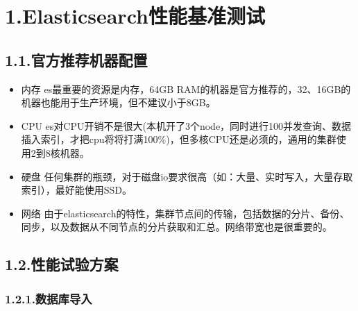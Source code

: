 \documentclass{article}
\begin{document}
\section{1.\hspace*{0.5em}Elasticsearch性能基准测试}\label{sec-elasticsearch}%

\subsection{1.1.\hspace*{0.5em}官方推荐机器配置}\label{section}%

\begin{itemize}[noitemsep,topsep=\mdcompacttopsep]%

\item{}内存    \mdbr
{}es最重要的资源是内存，64GB RAM的机器是官方推荐的，32、16GB的机器也能用于生产环境，但不建议小于8GB。%

\item{}CPU    \mdbr
{}es对CPU开销不是很大(本机开了3个node，同时进行100并发查询、数据插入索引，才把cpu将将打满100\%)，但多核CPU还是必须的，通用的集群使用2到8核机器。%

\item{}硬盘    \mdbr
{}任何集群的瓶颈，对于磁盘io要求很高（如：大量、实时写入，大量存取索引），最好能使用SSD。%

\item{}网络    \mdbr
{}由于elasticsearch的特性，集群节点间的传输，包括数据的分片、备份、同步，以及数据从不同节点的分片获取和汇总。网络带宽也是很重要的。%
\end{itemize}%

\subsection{1.2.\hspace*{0.5em}性能试验方案}\label{section}%

\subsubsection{1.2.1.\hspace*{0.5em}数据库导入}\label{section}%
\end{document}
